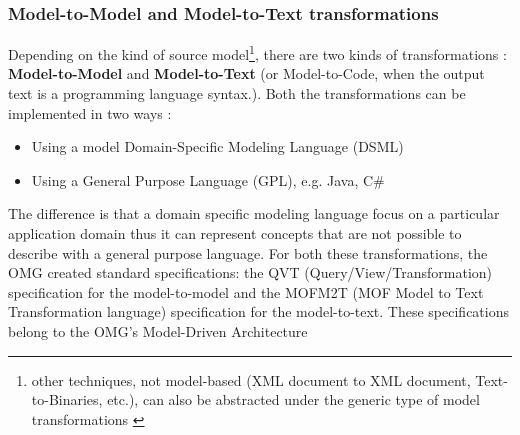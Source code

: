 \subsubsection{Model-to-Model and Model-to-Text transformations}
\label{m2m&m2t}
Depending on the kind of source model\footnote{other techniques, not model-based (XML document to XML document, Text-to-Binaries, etc.), can also be abstracted under the generic type of model transformations \cite{M2TandM2M}}, there are two kinds of transformations \cite{Papa11}: \textbf{Model-to-Model} and \textbf{Model-to-Text} (or Model-to-Code, when the output text is a programming language syntax.). Both the transformations can be implemented in two ways \cite{M2TandM2M}:
\begin{itemize}
 \item Using a model Domain-Specific Modeling Language (DSML)
 \item Using a General Purpose Language (GPL), e.g. Java, C\#
\end{itemize}
The difference is that a domain specific modeling language focus on a particular application domain thus it can represent concepts that are not possible to describe with a general purpose language.
For both these transformations, the OMG created standard specifications: the QVT (Query/View/Transformation) specification for the model-to-model and the MOFM2T (MOF Model to Text Transformation language) specification for the model-to-text. These specifications belong to the OMG's Model-Driven Architecture

